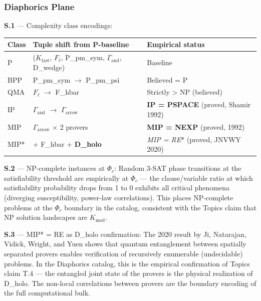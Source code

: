 \documentclass[11pt,a4paper]{article}
\begin{document}
\subsubsection{Diaphorics Plane}

\textbf{S.1} --- Complexity class encodings:

\begin{table}[htbp]
\centering
\small
{}
\begin{tabularx}{\textwidth}{>{\centering\arraybackslash}X >{\centering\arraybackslash}X >{\centering\arraybackslash}X}
\toprule
\rowcolor{gray!25}\textbf{Class} & \textbf{Tuple shift from P-baseline} & \textbf{Empirical status} \\
\midrule
\rowcolors{1}{white}{gray!10}
P & ($K_\text{fast}$, $F_{\ell}$, P\_pm\_sym, $\Gamma_\text{and}$, D\_wedge) & Baseline \\
BPP & P\_pm\_sym $\to$ P\_pm\_psi & Believed = P \\
QMA & $F_{\ell}$ $\to$ F\_hbar & Strictly \textgreater{} NP (believed) \\
IP & $\Gamma_\text{and}$ $\to$ $\Gamma_\text{arrow}$ & \textbf{IP = PSPACE} (proved, Shamir 1992) \\
MIP & $\Gamma_\text{arrow}$ $\times$ 2 provers & \textbf{MIP = NEXP} (proved, 1992) \\
MIP* & + F\_hbar + \textbf{D\_holo} & \emph{\emph{MIP} = RE}* (proved, JNVWY 2020) \\
\bottomrule
\end{tabularx}
\end{table}

\textbf{S.2} --- NP-complete instances at $\Phi_c$: Random 3-SAT phase transitions at the satisfiability threshold are empirically at $\Phi_c$ --- the clause/variable ratio at which satisfiability probability drops from 1 to 0 exhibits all critical phenomena (diverging susceptibility, power-law correlations). This places NP-complete problems at the $\Phi_c$ boundary in the catalog, consistent with the Topics claim that NP solution landscapes are $K_\text{mod}$.

\textbf{S.3} --- MIP* = RE as D\_holo confirmation: The 2020 result by Ji, Natarajan, Vidick, Wright, and Yuen shows that quantum entanglement between spatially separated provers enables verification of recursively enumerable (undecidable) problems. In the Diaphorics catalog, this is the empirical confirmation of Topics claim T.4 --- the entangled joint state of the provers is the physical realization of D\_holo. The non-local correlations between provers are the boundary encoding of the full computational bulk.
\end{document}
